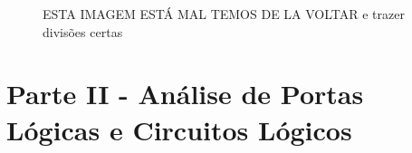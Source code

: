 \documentclass[pdftex,12pt,a4paper]{report}
\begin{document}
\begin{figure}[h]
\centerline{}
\caption{ESTA IMAGEM ESTÁ MAL TEMOS DE LA VOLTAR e trazer divisões certas}\label{grafico_1c_osciloscopio}
\end{figure}

\newpage

\section{Parte II - Análise	de	Portas	Lógicas	e	Circuitos	Lógicos}
\end{document}
